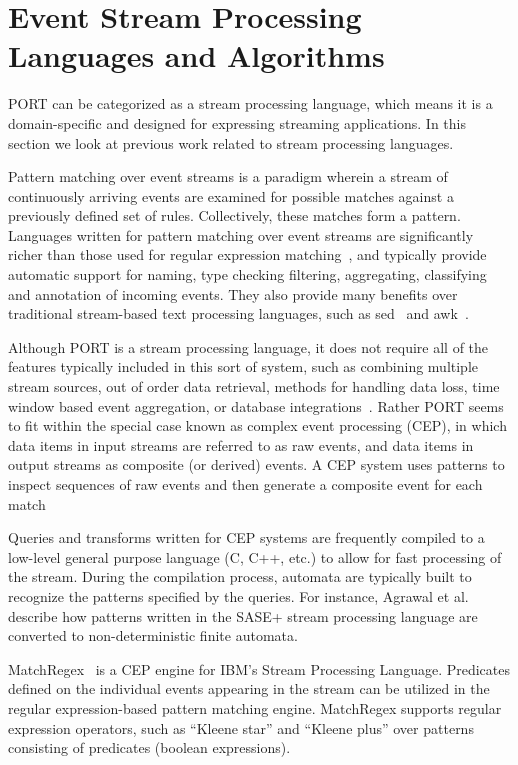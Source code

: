 \section{Event Stream Processing Languages and Algorithms}
PORT can be categorized as a stream processing language,
which means it is a domain-specific and
designed for expressing streaming applications.
In this section we look at previous work related to stream processing languages.

Pattern matching
over event streams is a paradigm
wherein a stream of continuously arriving events are examined for
possible matches against a previously defined set of rules. Collectively, these matches form a pattern.
Languages written for pattern matching over event
streams are significantly richer than those used for regular expression
matching~\cite{DBLP:conf/sigmod/AgrawalDGI08},
and typically provide automatic
support for naming, type checking filtering, aggregating, classifying and
annotation of incoming events. They also  provide many benefits over traditional
stream-based text processing languages, such as sed~\cite{Mcmahon1979sed} and
awk~\cite{DBLP:journals/spe/AhoKW79}.

Although PORT is a stream processing language, it does not
require all of the features typically
included in this sort of system, such as
combining multiple stream sources,
out of order data retrieval,
methods for handling data loss,
time window based event aggregation,
or database integrations~\cite{DBLP:journals/csur/DayarathnaP18}.
Rather PORT seems to fit within the special case
known as complex event processing (CEP),
in which data items in input streams are referred to as raw events, and data items in output streams
as composite (or derived) events. A CEP system uses patterns to inspect
sequences of raw events and then generate a composite event for each
match~\cite{DBLP:journals/ibmrd/HirzelAGJKKMNSSW13}

Queries and transforms written for CEP systems are
frequently compiled to a low-level general purpose language (C, C++, etc.) to allow for fast
processing of the stream. During the compilation process, automata are typically
built to recognize the patterns specified by the queries. For instance, Agrawal et
al.~\cite{DBLP:conf/sigmod/AgrawalDGI08} describe how patterns written in the SASE+ stream
processing language are converted to non-deterministic finite automata. 

MatchRegex~\cite{DBLP:conf/debs/Hirzel12} is a CEP engine for IBM’s Stream Processing
Language. Predicates defined on the individual events appearing in the
stream can be utilized in the regular expression-based pattern matching
engine. MatchRegex supports regular expression operators, such as “Kleene star”
and “Kleene plus” over patterns consisting of predicates (boolean expressions).

